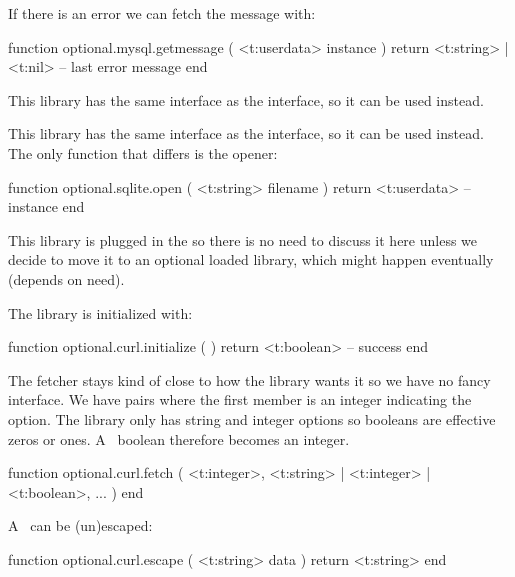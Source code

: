 If there is an error we can fetch the message with:

\starttyping[option=LUA]
function optional.mysql.getmessage ( <t:userdata> instance )
    return <t:string> | <t:nil> -- last error message
end
\stoptyping

\stopsubsubsubject

\startsubsubsubject[title=postgress]

This library has the same interface as the  interface, so it can be
used instead.

\stopsubsubsubject

\startsubsubsubject[title=sqlite]

This library has the same interface as the  interface, so it can be
used instead. The only function that differs is the opener:

\starttyping[option=LUA]
function optional.sqlite.open ( <t:string> filename )
    return <t:userdata> -- instance
end
\stoptyping

\stopsubsubsubject

\stopsubsection

\startsubsection[title=Whatever]

\startsubsubsubject[title=cerf]

This library is plugged in the  so there is no need to discuss it
here unless we decide to move it to an optional loaded library, which might
happen eventually (depends on need).

\stopsubsubsubject

\startsubsubsubject[title=curl]

The library is initialized with:

\starttyping[option=LUA]
function optional.curl.initialize ( )
    return <t:boolean> -- success
end
\stoptyping

The fetcher stays kind of close to how the library wants it so we have no fancy
interface. We have pairs where the first member is an integer indicating the
option. The library only has string and integer options so booleans are effective
zeros or ones. A \LUA\ boolean therefore becomes an integer.

\starttyping[option=LUA]
function optional.curl.fetch (
    {
        <t:integer>, <t:string> | <t:integer> | <t:boolean>,
        ...
    }
)
end
\stoptyping

A \URL\ can be (un)escaped:

\starttyping[option=LUA]
function optional.curl.escape ( <t:string> data )
    return <t:string>
end

